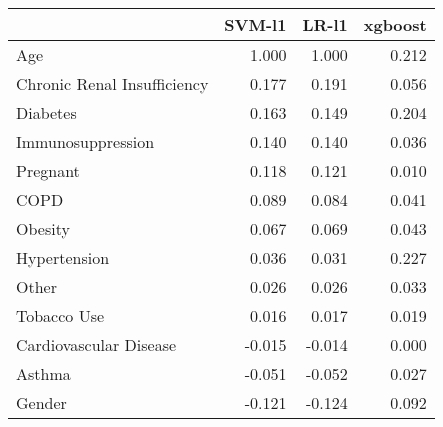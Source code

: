 \begin{tabular}{lrrr}
\toprule
{} &  SVM-l1 &  LR-l1 &  xgboost \\
\midrule
Age                         &   1.000 &  1.000 &    0.212 \\
Chronic Renal Insufficiency &   0.177 &  0.191 &    0.056 \\
Diabetes                    &   0.163 &  0.149 &    0.204 \\
Immunosuppression           &   0.140 &  0.140 &    0.036 \\
Pregnant                    &   0.118 &  0.121 &    0.010 \\
COPD                        &   0.089 &  0.084 &    0.041 \\
Obesity                     &   0.067 &  0.069 &    0.043 \\
Hypertension                &   0.036 &  0.031 &    0.227 \\
Other                       &   0.026 &  0.026 &    0.033 \\
Tobacco Use                 &   0.016 &  0.017 &    0.019 \\
Cardiovascular Disease      &  -0.015 & -0.014 &    0.000 \\
Asthma                      &  -0.051 & -0.052 &    0.027 \\
Gender                      &  -0.121 & -0.124 &    0.092 \\
\bottomrule
\end{tabular}
